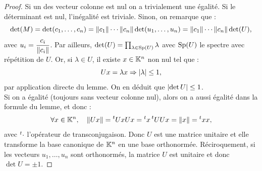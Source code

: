 \begin{proof}
Si un des vecteur colonne est nul on a trivialement une égalité. 
Si le déterminant est nul, l'inégalité est triviale.
Sinon, on remarque que :
\[ \det(M) = \det(c_1, \dots, c_n) = \lVert c_1\rVert \cdots \lVert c_n\rVert \det(u_1, \dots, u_n) = \lVert c_1\rVert \cdots \lVert c_n\rVert \det(U), \]
avec $u_i = \dfrac{c_i}{\lVert c_i\rVert}$.
Par ailleurs, $\det(U)=\prod_{\lambda \in \operatorname{\text{Sp}}(U)} \lambda$ avec $\operatorname{\text{Sp}}(U)$ le spectre avec répétition de $U$.
Or, si $\lambda \in U$, il existe $x \in \mathbb{K}^n$ non nul tel que :
\[ Ux = \lambda x \Rightarrow \lvert\lambda\rvert \leq 1 , \]
par application directe du lemme. On en déduit que $\lvert\det{U}\rvert \leq 1$. \\

Si on a égalité (toujours sans vecteur colonne nul), alors on a aussi égalité dans la formule du lemme, et donc :
\[ \forall x \in \mathbb{K}^n, \quad \lVert Ux\rVert = \prescript{t}{}{Ux} Ux = \prescript{t}{}{x} \prescript{t}{}{U} U x = \lVert x\rVert = \prescript{t}{}{x} x , \]
avec $\prescript{t}{}{\cdot}$ l'opérateur de transconjugaison. 
Donc $U$ est une matrice unitaire et elle transforme la base canonique de $\mathbb{K}^n$ en une base orthonormée.
Réciroquement, si les vecteurs $u_1, \dots, u_n$ sont orthonormés, la matrice $U$ est unitaire et donc $\det{U} = \pm 1$.
\end{proof}

